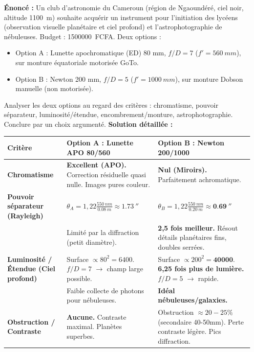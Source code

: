 \documentclass[11pt]{article}
\begin{document}
\begin{exoresolu}
\textbf{Énoncé :} Un club d'astronomie du Cameroun (région de Ngaoundéré, ciel noir, altitude \SI{1100}{m}) souhaite acquérir un instrument pour l'initiation des lycéens (observation visuelle planétaire et ciel profond) et l'astrophotographie de nébuleuses. Budget : \SI{1 500 000}{FCFA}. Deux options :
\begin{itemize}
    \item Option A : Lunette apochromatique (ED) 80 mm, $f/D = 7$ ($f' = \SI{560}{mm}$), sur monture équatoriale motorisée GoTo.
    \item Option B : Newton 200 mm, $f/D = 5$ ($f' = \SI{1000}{mm}$), sur monture Dobson manuelle (non motorisée).
\end{itemize}
Analyser les deux options au regard des critères : chromatisme, pouvoir séparateur, luminosité/étendue, encombrement/monture, astrophotographie. Conclure par un choix argumenté.
\tcblower
\textbf{Solution détaillée :}
\begin{center}
\begin{tabularx}{\linewidth}{|l|X|X|}
\hline
\rowcolor{popblueL} \textbf{Critère} & \textbf{Option A : Lunette APO 80/560} & \textbf{Option B : Newton 200/1000} \\ \hline
\textbf{Chromatisme} & \textbf{Excellent (APO).} Correction résiduelle quasi nulle. Images pures couleur. & \textbf{Nul (Miroirs).} Parfaitement achromatique. \\ \hline
\textbf{Pouvoir séparateur (Rayleigh)} & $\theta_A = 1{,}22 \frac{\SI{550}{nm}}{\SI{0,08}{m}} \approx \SI{1,73}{''}$ & $\theta_B = 1{,}22 \frac{\SI{550}{nm}}{\SI{0,20}{m}} \approx \mathbf{\SI{0,69}{''}}$ \\
& Limité par la diffraction (petit diamètre). & \textbf{2,5 fois meilleur.} Résout détails planétaires fins, doubles serrées. \\ \hline
\textbf{Luminosité / Étendue (Ciel profond)} & Surface $\propto 80^2 = 6400$. $f/D=7$ $\rightarrow$ champ large possible. & Surface $\propto 200^2 = \mathbf{40000}$. \textbf{6,25 fois plus de lumière.} $f/D=5$ $\rightarrow$ rapide. \\
& Faible collecte de photons pour nébuleuses. & \textbf{Idéal nébuleuses/galaxies.} \\ \hline
\textbf{Obstruction / Contraste} & \textbf{Aucune.} Contraste maximal. Planètes superbes. & Obstruction $\approx 20-25\%$ (secondaire 40-50mm). Perte contraste légère. Pics diffraction. \\ \hline

\end{tabularx}
\end{center}
\end{exoresolu}
\end{document}
